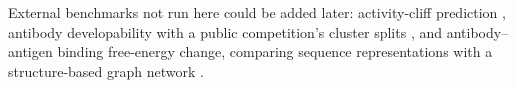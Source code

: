 External benchmarks not run here could be added later: activity-cliff prediction \citep{Dablander2023}, antibody developability with a public competition's cluster splits \citep{vanNiekerk2026}, and antibody--antigen binding free-energy change, comparing sequence representations with a structure-based graph network \citep{Hummer2025}.

% 
% 
% 



